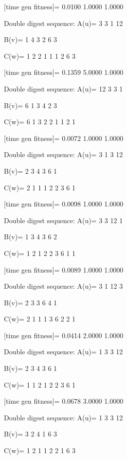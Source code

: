 [time gen fitness]=
    0.0100    1.0000    1.0000

Double digest sequence:
A(u)=
     3     3     1    12

B(v)=
     1     4     3     2     6     3

C(w)=
     1     2     2     1     1     1     2     6     3

[time gen fitness]=
    0.1359    5.0000    1.0000

Double digest sequence:
A(u)=
    12     3     3     1

B(v)=
     6     1     3     4     2     3

C(w)=
     6     1     3     2     2     1     1     2     1

[time gen fitness]=
    0.0072    1.0000    1.0000

Double digest sequence:
A(u)=
     3     1     3    12

B(v)=
     2     3     4     3     6     1

C(w)=
     2     1     1     1     2     2     3     6     1

[time gen fitness]=
    0.0098    1.0000    1.0000

Double digest sequence:
A(u)=
     3     3    12     1

B(v)=
     1     3     4     3     6     2

C(w)=
     1     2     1     2     2     3     6     1     1

[time gen fitness]=
    0.0089    1.0000    1.0000

Double digest sequence:
A(u)=
     3     1    12     3

B(v)=
     2     3     3     6     4     1

C(w)=
     2     1     1     1     3     6     2     2     1

[time gen fitness]=
    0.0414    2.0000    1.0000

Double digest sequence:
A(u)=
     1     3     3    12

B(v)=
     2     3     4     3     6     1

C(w)=
     1     1     2     1     2     2     3     6     1

[time gen fitness]=
    0.0678    3.0000    1.0000

Double digest sequence:
A(u)=
     1     3     3    12

B(v)=
     3     2     4     1     6     3

C(w)=
     1     2     1     1     2     2     1     6     3

